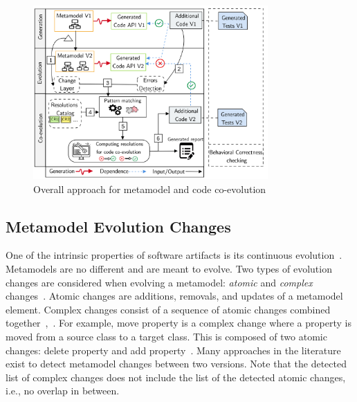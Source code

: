 \begin{figure}[t]\centering%
	\centering
	\includegraphics[width=0.8\textwidth]{./pics/chapter1pics/ApproachV5.png}
	\caption{Overall approach for metamodel and code co-evolution}
	\label{fig:overallapproach}
	\vspace{-1em}
\end{figure}
\subsection{Metamodel Evolution Changes}
\label{mmchanges}

One of the intrinsic properties of software artifacts is its continuous evolution~\cite{mens2008introduction}. Metamodels are no different and are meant to evolve. 
Two types of evolution changes are considered when evolving a metamodel: \emph{atomic} and \emph{complex} changes~\cite{Herrmannsdoerfer2011}. 
Atomic changes are additions, removals, and updates of a metamodel element. Complex changes consist of a sequence of atomic changes combined together~\cite{vermolen_reconstructing_2012},~\cite{khelladi2015detecting}. For example, move property is a complex change where a property is moved from a source class to a target class. This is composed of two atomic changes: delete property and add property~\cite{Herrmannsdoerfer2011}. 
Many approaches in the literature~\cite{Alter2015, williams2012searching,cicchetti_managing_2009,langer_posteriori_2013,vermolen_reconstructing_2012,Khelladi2016,bettini2022executable} exist to detect metamodel changes between two versions. Note that the detected list of complex changes does not include the list of the detected atomic changes, i.e., no overlap in between. 

